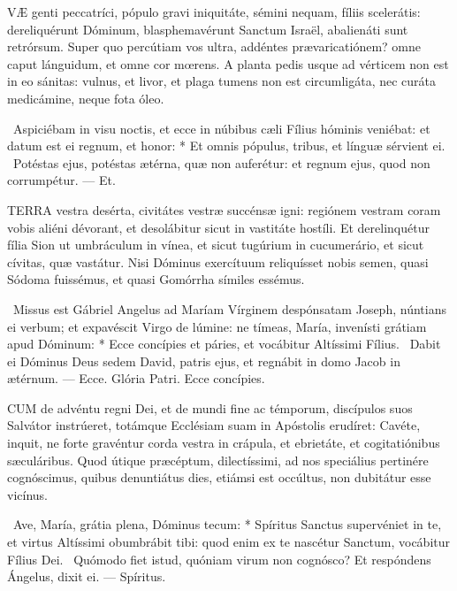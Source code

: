 
\lettrine[lines=2]{V}{Æ} genti peccatríci, pópulo gravi iniquitáte, sémini nequam, fíliis scelerátis: dereliquérunt Dóminum, blasphemavérunt Sanctum Israël, abalienáti sunt retrórsum. Super quo percútiam vos ultra, addéntes prævaricatiónem? omne caput lánguidum, et omne cor mœrens. A planta pedis usque ad vérticem non est in eo sánitas: vulnus, et livor, et plaga tumens non est circumligáta, nec curáta medicámine, neque fota óleo.

\R\ Aspiciébam in visu noctis, et ecce in núbibus cæli Fílius hóminis veniébat: et datum est ei regnum, et honor: * Et omnis pópulus, tribus, et línguæ sérvient ei. \V\ Potéstas ejus, potéstas ætérna, quæ non auferétur: et regnum ejus, quod non corrumpétur. --- Et.


\lettrine[lines=2]{T}{ERRA} vestra desérta, civitátes vestræ succénsæ igni: regiónem vestram coram vobis aliéni dévorant, et desolábitur sicut in vastitáte hostíli. Et derelinquétur fília Sion ut umbráculum in vínea, et sicut tugúrium in cucumerário, et sicut cívitas, quæ vastátur. Nisi Dóminus exercítuum reliquísset nobis semen, quasi Sódoma fuissémus, et quasi Gomórrha símiles essémus.

\R\ Missus est Gábriel Angelus ad Maríam Vírginem despónsatam Joseph, núntians ei verbum; et expavéscit Virgo de lúmine: ne tímeas, María, invenísti grátiam apud Dóminum: * Ecce concípies et páries, et vocábitur Altíssimi Fílius. \V\ Dabit ei Dóminus Deus sedem David, patris ejus, et regnábit in domo Jacob in ætérnum. --- Ecce. Glória Patri. Ecce concípies.





\lettrine[lines=2]{C}{UM} de advéntu regni Dei, et de mundi fine ac témporum, discípulos suos Salvátor instrúeret, totámque Ecclésiam suam in Apóstolis erudíret: Cavéte, inquit, ne forte gravéntur corda vestra in crápula, et ebrietáte, et cogitatiónibus sæculáribus. Quod útique præcéptum, dilectíssimi, ad nos speciálius pertinére cognóscimus, quibus denuntiátus dies, etiámsi est occúltus, non dubitátur esse vicínus.

\R\ Ave, María, grátia plena, Dóminus tecum: * Spíritus Sanctus supervéniet in te, et virtus Altíssimi obumbrábit tibi: quod enim ex te nascétur Sanctum, vocábitur Fílius Dei. \V\ Quómodo fiet istud, quóniam virum non cognósco? Et respóndens Ángelus, dixit ei. --- Spíritus.

